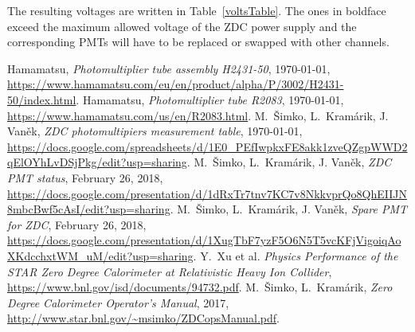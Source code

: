\documentclass[a4paper,10pt]{article}
\begin{document}
The resulting voltages are written in Table~\ref{voltsTable}. The ones in boldface exceed the maximum allowed voltage of the ZDC power supply and the corresponding PMTs will have to be replaced or swapped with other channels.





\begin{thebibliography}{10}
 Hamamatsu, \textit{Photomultiplier tube assembly H2431-50}, \today, \url{https://www.hamamatsu.com/eu/en/product/alpha/P/3002/H2431-50/index.html}.
 Hamamatsu, \textit{Photomultiplier tube R2083}, \today, \url{https://www.hamamatsu.com/us/en/R2083.html}.
 M.\ Šimko, L.\ Kramárik, J. Vaněk, \textit{ZDC photomultipiers measurement table}, \today,\\ \url{https://docs.google.com/spreadsheets/d/1E0_PEfIwpkxFE8akk1zveQZgpWWD2qElOYhLvDSjPkg/edit?usp=sharing}.
 M.\ Šimko, L.\ Kramárik, J. Vaněk, \textit{ZDC PMT status}, February 26, 2018,
 \url{https://docs.google.com/presentation/d/1dRxTr7tnv7KC7v8NkkvprQo8QhEIIJN8mbcBwf5cAsI/edit?usp=sharing}.
 M.\ Šimko, L.\ Kramárik, J. Vaněk, \textit{Spare PMT for ZDC}, February 26, 2018, \url{https://docs.google.com/presentation/d/1XugTbF7yzF5O6N5T5vcKFjVigoiqAoXKdcchxtWM_uM/edit?usp=sharing}.
 Y.\ Xu et al. \textit{Physics Performance of the STAR Zero Degree Calorimeter at Relativistic Heavy Ion Collider}, \url{https://www.bnl.gov/isd/documents/94732.pdf}.
 M.\ Šimko, L.\ Kramárik, \textit{Zero Degree Calorimeter Operator’s
Manual}, 2017, \url{http://www.star.bnl.gov/~msimko/ZDCopsManual.pdf}.
\end{thebibliography}
\end{document}
